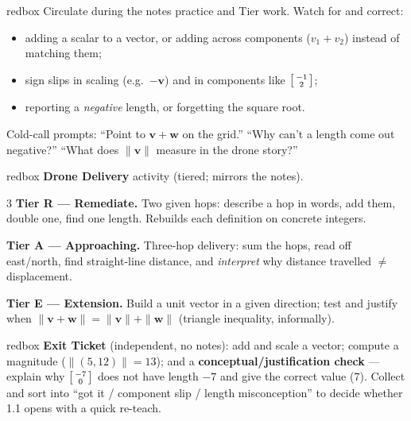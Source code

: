 \documentclass[10pt]{article}
\newcommand{\vv}{\mathbf{v}}
\newcommand{\ww}{\mathbf{w}}
\begin{document}
\begin{skillbox}{redbox}
Circulate during the notes practice and Tier work. Watch for and correct:
\begin{itemize}[leftmargin=1.2em, nosep]
  \item adding a scalar to a vector, or adding across components ($v_1+v_2$) instead of matching them;
  \item sign slips in scaling (e.g.\ $-\vv$) and in components like $\begin{bsmallmatrix} -1\\2 \end{bsmallmatrix}$;
  \item reporting a \emph{negative} length, or forgetting the square root.
\end{itemize}
Cold-call prompts: ``Point to $\vv+\ww$ on the grid.'' ``Why can't a length come out negative?''
``What does $\|\vv\|$ measure in the drone story?''
\end{skillbox}

\begin{skillbox}{redbox}
\textbf{Drone Delivery} activity (tiered; mirrors the notes).
\begin{multicols}{3}
\textbf{Tier R --- Remediate.} Two given hops: describe a hop in words, add them, double one,
find one length. Rebuilds each definition on concrete integers.

\columnbreak
\textbf{Tier A --- Approaching.} Three-hop delivery: sum the hops, read off east/north, find
straight-line distance, and \emph{interpret} why distance travelled $\ne$ displacement.

\columnbreak
\textbf{Tier E --- Extension.} Build a unit vector in a given direction; test and justify when
$\|\vv+\ww\|=\|\vv\|+\|\ww\|$ (triangle inequality, informally).
\end{multicols}
\end{skillbox}

\begin{skillbox}{redbox}
\textbf{Exit Ticket} (independent, no notes): add and scale a vector; compute a magnitude
($\|(5,12)\|=13$); and a \textbf{conceptual/justification check} --- explain why
$\begin{bsmallmatrix} -7\\0 \end{bsmallmatrix}$ does not have length $-7$ and give the correct
value ($7$). Collect and sort into ``got it / component slip / length misconception'' to decide
whether 1.1 opens with a quick re-teach.
\end{skillbox}
\end{document}
